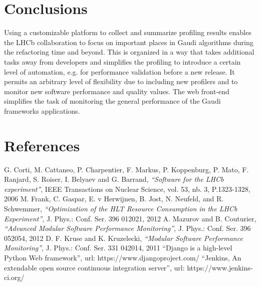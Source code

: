 \documentclass[a4paper]{jpconf}
\begin{document}
\section{Conclusions}
\label{sec:conclusions}

Using a customizable platform to collect and summarize profiling results enables the LHCb collaboration to focus on important places in Gaudi algorithms during the refactoring time and beyond. This is organized in a way that takes additional tasks away from developers and simplifies the profiling to introduce a certain level of automation, e.g. for performance validation before a new release. It permits an arbitrary level of flexibility due to including new profilers and to monitor new software performance and quality values. The web front-end simplifies the task of monitoring the general performance of the Gaudi frameworks applications. 

\section*{References}

\begin{thebibliography}{3}
 G. Corti, M. Cattaneo, P. Charpentier, F. Markus, P. Koppenburg, P. Mato, F. Ranjard, S. Roiser, I. Belyaev and G. Barrand, {\it ``Software for the LHCb experiment''}, IEEE Transactions on Nuclear Science, vol. 53, nb. 3, P.1323-1328, 2006
M. Frank, C. Gaspar, E. v Herwijnen, B. Jost, N. Neufeld, and R. Schwemmer, {\it ``Optimization of the HLT Resource Consumption in the LHCb Experiment''}, J. Phys.: Conf. Ser. 396 012021, 2012
 A. Mazurov and B. Couturier, {\it ``Advanced Modular Software Performance Monitoring''}, J. Phys.: Conf. Ser. 396 052054, 2012
 D. F. Kruse and K. Kruzelecki, {\it ``Modular Software Performance Monitoring''}, J. Phys.: Conf. Ser. 331 042014, 2011
 ``Django is a high-level Python Web framework'', url: https://www.djangoproject.com/
 ``Jenkins, An extendable open source continuous integration server'', url: https://www.jenkins-ci.org/
\end{thebibliography}
\end{document}
